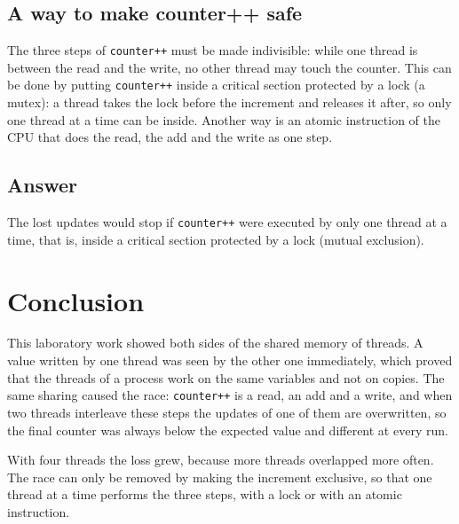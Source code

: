 \documentclass[12pt,a4paper]{article}
\begin{document}
\subsection{A way to make counter++ safe}

The three steps of \texttt{counter++} must be made indivisible: while one thread is between the read and the write, no other thread may touch the counter. This can be done by putting \texttt{counter++} inside a critical section protected by a lock (a mutex): a thread takes the lock before the increment and releases it after, so only one thread at a time can be inside. Another way is an atomic instruction of the CPU that does the read, the add and the write as one step.

\subsection{Answer}

The lost updates would stop if \texttt{counter++} were executed by only one thread at a time, that is, inside a critical section protected by a lock (mutual exclusion).

\newpage
\section*{Conclusion}

This laboratory work showed both sides of the shared memory of threads. A value written by one thread was seen by the other one immediately, which proved that the threads of a process work on the same variables and not on copies. The same sharing caused the race: \texttt{counter++} is a read, an add and a write, and when two threads interleave these steps the updates of one of them are overwritten, so the final counter was always below the expected value and different at every run.

With four threads the loss grew, because more threads overlapped more often. The race can only be removed by making the increment exclusive, so that one thread at a time performs the three steps, with a lock or with an atomic instruction.
\end{document}
